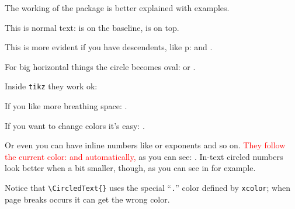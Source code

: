 \documentclass{ltxdoc}
\begin{document}
The working of the package is better explained with examples.

\begin{LTXexample}
This is normal text:  is on the baseline,  is on top.

This is more evident if you have descendents, like p: and .
\end{LTXexample}


\begin{LTXexample}
For big horizontal things the circle becomes oval:  or .
\end{LTXexample}


\begin{LTXexample}
Inside \texttt{tikz} they work ok:

\end{LTXexample}


\begin{LTXexample}
\tikzset{/csteps/inner ysep=10pt}
\tikzset{/csteps/inner xsep=10pt}
If you like more breathing space:
     .
\par\bigskip
\end{LTXexample}

\begin{LTXexample}
\tikzset{/csteps/inner color=green}
\tikzset{/csteps/outer color=gray}
If you want to change colors it's easy:
     .
\par\bigskip
\end{LTXexample}

\begin{LTXexample}
Or even you can have inline numbers like  or
exponents\textsuperscript{} and so on.
\textcolor{red}{They follow the current color:   and  automatically,} as you can see:  . In-text circled numbers look better when a bit smaller, though, as you can see in {\small{}} for example.
\end{LTXexample}

Notice that \verb|\CircledText{}| uses the special ``\texttt{.}'' color defined by \texttt{xcolor}; when page breaks occurs it can get the wrong color.
\end{document}
